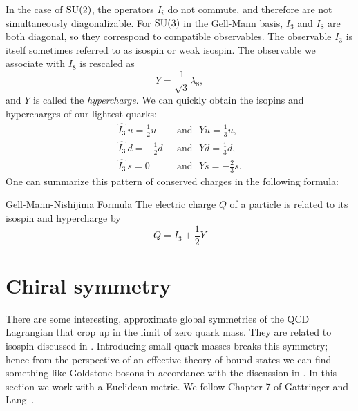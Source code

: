 In the case of $\operatorname{SU}(2)$, the operators $I_i$ do not commute, and therefore are
not simultaneously diagonalizable. For $\operatorname{SU}(3)$ in the Gell-Mann basis,
$I_3$ and $I_8$ are both diagonal, so they correspond to compatible
observables. The observable $I_3$ is itself sometimes referred to
as isospin or weak isospin. The observable we associate with $I_8$ is rescaled as
\begin{equation}
  Y=\frac{1}{\sqrt{3}}\lambda_8,
\end{equation}
and $Y$ is called the {\it hypercharge}. 
We can quickly obtain the isopins and hypercharges of
our lightest quarks: 
\begin{equation}\begin{aligned}
\hat{I_3}\,u =\frac{1}{2}u ~~~ &\text{and}~~~\hat{Y}u=\frac{1}{3}u,\\
\hat{I_3}\,d =-\frac{1}{2}d ~~~ &\text{and}~~~\hat{Y}d=\frac{1}{3}d,\\
\hat{I_3}\,s = 0           ~~~ &\text{and}~~~\hat{Y}s=-\frac{2}{3}s.
\end{aligned}\end{equation}
One can summarize this pattern of conserved charges in the following formula:
\begin{theorem}{Gell-Mann-Nishijima Formula}{}
  The electric charge $Q$ of a particle is related to its isospin and
  hypercharge by
  \begin{equation*}
    Q=I_3+\frac{1}{2}Y
  \end{equation*}
\end{theorem}


\section{Chiral symmetry}\label{sec:cscont}

There are some interesting, approximate global symmetries of the QCD Lagrangian
that crop up in the limit of zero quark mass. They are related to isospin
discussed in . Introducing small quark masses breaks this
symmetry; hence from the perspective of an effective theory of bound states we
can find something like Goldstone bosons in accordance with the discussion in
. 
In this section we work with a Euclidean metric. We follow
Chapter 7 of Gattringer and
Lang~\cite{gattringer_quantum_2010}.

